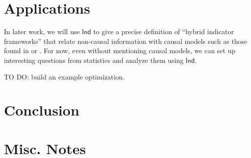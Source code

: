 \documentclass{sig-alternate-05-2015}
\theoremstyle{plain}
\theoremstyle{plain}
\theoremstyle{remark}
\newcommand{\redout}[1]{{\color{red}#1}}
\newcommand{\Cat}[1]{\mathsf{#1}}
\def\Ind{\Cat{Ind}}
\begin{document}

\section{Applications}
In later work, we will use $\Ind$ to give a precise definition of ``hybrid indicator frameworks'' that relate non-causal information with causal models such as those found in \cite{coecke_spekkens} or \cite{fong13}. For now, even without mentioning causal models, we can set up interesting questions from statistics and analyze them using $\Ind$.

\redout{TO DO: build an example optimization.}

 
\section{Conclusion}

\section{Misc. Notes}
\end{document}
